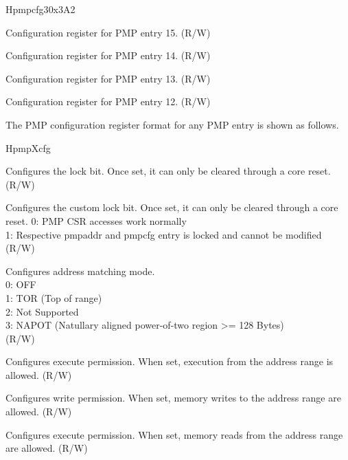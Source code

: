 \begin{register}{H}{pmpcfg3}{0x3A2}
\label{regdesc:pmpcfg3}%
%
%
%
%
\regnewline%
\begin{regdesc}
\begin{reglist}
\label{fielddesc:pmp15cfg}\item [pmp15cfg] Configuration register for PMP entry 15. (R/W)
\label{fielddesc:pmp14cfg}\item [pmp14cfg] Configuration register for PMP entry 14. (R/W)
\label{fielddesc:pmp13cfg}\item [pmp13cfg] Configuration register for PMP entry 13. (R/W)
\label{fielddesc:pmp12cfg}\item [pmp12cfg] Configuration register for PMP entry 12. (R/W)
\end{reglist}
\end{regdesc}
\end{register}

The PMP configuration register format for any PMP entry is shown as follows.

\begin{register}{H}{pmpXcfg}{}
\label{regdesc:pmpXcfg}%
%
%
%
%
%
%
%
\regnewline%
\begin{regdesc}
\begin{reglist}
\label{fielddesc:pmpXcfgL}\item [L] Configures the lock bit. Once set, it can only be cleared through a core reset. (R/W)
\label{fielddesc:pmpXcfgXL}\item [XL] Configures the custom lock bit. Once set, it can only be cleared through a core reset.
0: PMP CSR accesses work normally \\
1: Respective pmpaddr and pmpcfg entry is locked and cannot be modified \\
(R/W)
\label{fielddesc:pmpXcfgA}\item [A] Configures address matching mode.\\
0: OFF \\
1: TOR (Top of range) \\
2: Not Supported \\
3: NAPOT (Natullary aligned power-of-two region >= 128 Bytes)\\
(R/W)
\label{fielddesc:pmpXcfgX}\item [X] Configures execute permission. When set, execution from the address range is allowed. (R/W)
\label{fielddesc:pmpXcfgW}\item [W] Configures write permission. When set, memory writes to the address range are allowed. (R/W)
\label{fielddesc:pmpXcfgR}\item [R] Configures execute permission. When set, memory reads from the address range are allowed. (R/W)
\end{reglist}
\end{regdesc}
\end{register}

